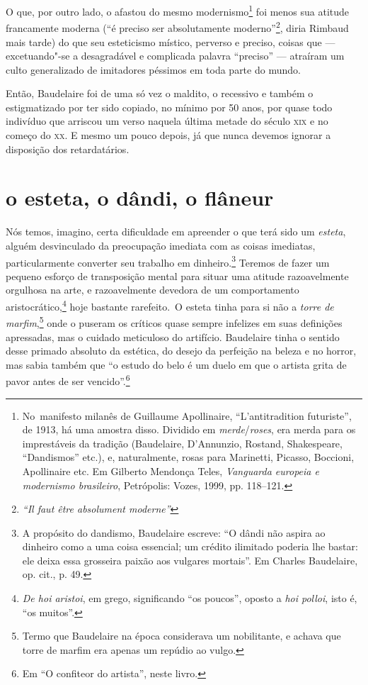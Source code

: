 O que, por outro lado, o afastou do mesmo modernismo\footnote{ No~manifesto 
milanês de Guillaume Apollinaire, “L’antitradition
futuriste”, de 1913, há uma amostra disso. Dividido em \textit{merde}/\textit{roses}, era
merda para os imprestáveis da tradição (Baudelaire, D’Annunzio,
Rostand, Shakespeare, “Dandismos” etc.), e, naturalmente, rosas para
Marinetti, Picasso, Boccioni, Apollinaire etc. Em Gilberto Mendonça Teles,
\textit{Vanguarda europeia e modernismo brasileiro}, Petrópolis:
Vozes, 1999, pp. 118--121.} foi menos sua atitude francamente
moderna (“é preciso ser absolutamente moderno”\footnote{ 
\textit{“Il faut être absolument moderne”}}, diria Rimbaud mais
tarde) do que seu esteticismo místico, perverso e preciso, coisas que ---
excetuando"-se a desagradável e complicada palavra “preciso” ---
atraíram um culto generalizado de imitadores péssimos em toda parte do
mundo. 

Então, Baudelaire foi de uma só vez o maldito, o recessivo e também o
estigmatizado por ter sido copiado, no mínimo por 50 anos, por quase
todo indivíduo que arriscou um verso naquela última metade do século
\textsc{xix} e no começo do \textsc{xx}. E mesmo um pouco depois, 
já que nunca devemos ignorar a disposição dos retardatários.

\section*{o esteta, o dândi, o flâneur}
Nós temos, imagino, certa dificuldade em apreender o que terá sido um
\textit{esteta}, alguém desvinculado da preocupação imediata com as
coisas imediatas, particularmente converter seu trabalho em
dinheiro.\footnote{ A propósito do dandismo, Baudelaire escreve: “O
dândi não aspira ao dinheiro como a uma coisa essencial; um crédito
ilimitado poderia lhe bastar: ele deixa essa grosseira paixão aos
vulgares mortais”. Em Charles Baudelaire, op. cit., p. 49.} 
Teremos de fazer um pequeno esforço de
transposição mental para situar uma atitude razoavelmente orgulhosa na
arte, e razoavelmente devedora de um comportamento
aristocrático,\footnote{ 
\textit{De hoi aristoi}, em grego, significando “os
poucos”, oposto a \textit{hoi polloi}, isto é, “os muitos”.}
hoje bastante rarefeito.~O esteta tinha para si não a \textit{torre de marfim},\footnote{ Termo que Baudelaire
na época considerava um nobilitante, e achava que torre de marfim era apenas um repúdio ao vulgo.} 
onde o puseram os críticos quase sempre infelizes em suas definições
apressadas, mas o cuidado meticuloso do artifício. Baudelaire tinha o
sentido desse primado absoluto da estética, do desejo da perfeição na
beleza e no horror, mas sabia também que “o estudo do belo é um duelo
em que o artista grita de pavor antes de ser vencido”.\footnote{ Em “O
confiteor do artista”, neste livro.}

